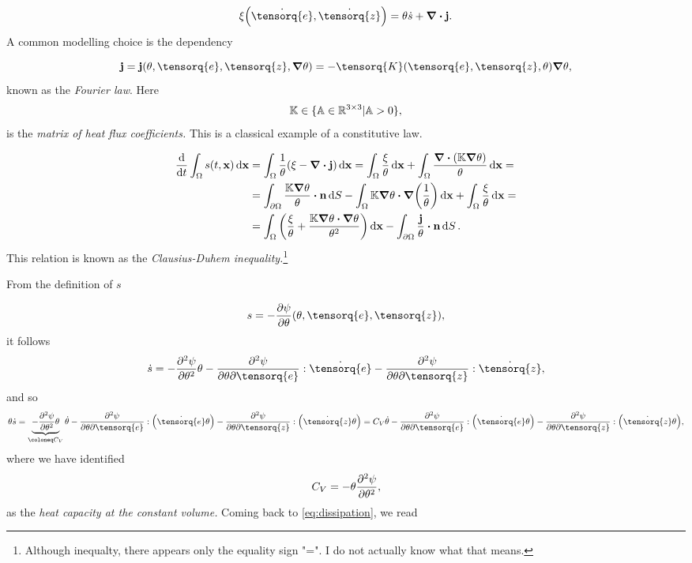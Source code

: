 \documentclass[reqno, a4paper]{article}
\begin{document}
\begin{equation}
	\label{eq:dissipation}
	\xi\qty(\dot{\tensorq{e}}, \dot{\tensorq{z}}) = \theta \dot{s} + \divergence{\vb{j}}.
\end{equation}
A common modelling choice is the dependency

\[
	\vb{j} = \vb{j}\qty(\theta, \tensorq{e}, \tensorq{z}, \grad \theta) = - \tensorq{K}\qty(\tensorq{e}, \tensorq{z}, \theta)\grad \theta,
\]
known as the \textit{Fourier law}. Here
\[
	\mathbb{K} \in \{ \mathbb{A} \in {\mathbb R}^{3 \times 3}| \mathbb{A} >0\},
\]
is the \textit{matrix of heat flux coefficients.} This is a classical example of a constitutive law.


\begin{align*}
	\dv{t} \int_{\Omega}s\qty(t,\vb{x})\dd{\vb{x}} &= \int_{\Omega}\frac{1}{\theta}\qty(\xi-\divergence{\vb{j}})\dd{\vb{x}} = \int_{\Omega}\frac{\xi}{\theta}\dd{\vb{x}} + \int_{\Omega}\frac{\divergence{\qty(\tensorq{K} \grad \theta)}}{\theta}\dd{\vb{x}} = \\
						       & = \int_{\partial \Omega}\frac{\tensorq{K}\grad \theta}{\theta} \vdot \vb{n}\dd{S} - \int_{\Omega}\tensorq{K} \grad \theta \vdot \grad\qty(\frac{1}{\theta})\dd{\vb{x}}+\int_{\Omega}\frac{\xi}{\theta}\dd{\vb{x}} = \\
						       & = \int_{\Omega}\qty(\frac{\xi}{\theta}+ \frac{\tensorq{K}\grad \theta \vdot \grad \theta}{\theta^{2}})\dd{\vb{x}}-\int_{\partial \Omega}\frac{\vb{j}}{\theta} \vdot \vb{n}\dd{S}.
\end{align*}
This relation is known as the \textit{Clausius-Duhem inequality.}\footnote{Although inequalty, there appears only the equality sign "=". I do not actually know what that means.}

From the definition of $s$

\[
	s = - \pdv{\psi}{\theta}\qty(\theta, \tensorq{e}, \tensorq{z}),
\]
it follows
\[
	\dot{s} = -\pdv[2]{\psi}{\theta} \theta - \pdv[2]{\psi}{\theta}{\tensorq{e}}:\dot{\tensorq{e}} - \pdv[2]{\psi}{\theta}{\tensorq{z}}:\dot{\tensorq{z}},
\]
and so
\[
	\theta \dot{s} = \underbrace{- \pdv[2]{\psi}{\theta} \theta}_{\coloneq C_V} \dot{\theta} - \pdv[2]{\psi}{\theta}{\tensorq{e}}:\qty(\dot{\tensorq{e}} \theta) - \pdv[2]{\psi}{\theta}{\tensorq{z}}:\qty(\dot{\tensorq{z}}\theta) = C_V \dot{\theta} - \pdv[2]{\psi}{\theta}{\tensorq{e}}:\qty(\dot{\tensorq{e}}\theta)- \pdv[2]{\psi}{\theta}{\tensorq{z}}:\qty(\dot{\tensorq{z}}\theta),
\]
where we have identified
\[
	C_V = - \theta \pdv[2]{\psi}{\theta},
\]
as the \textit{heat capacity at the constant volume.} Coming back to \ref{eq:dissipation}, we read
\end{document}
